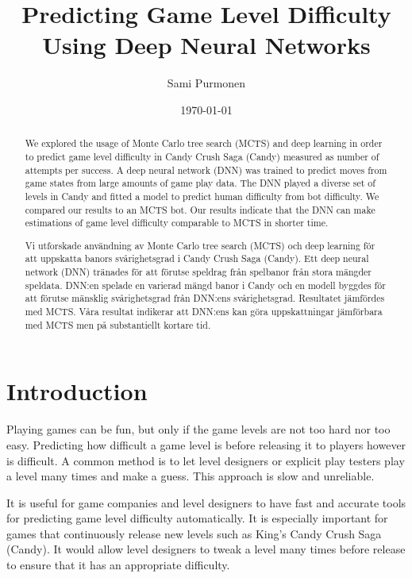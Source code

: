 \documentclass{kththesis}
\title{Predicting Game Level Difficulty Using Deep Neural Networks}
\author{Sami Purmonen}
\date{\today}
\begin{document}
\flyleaf

\begin{abstract}
We explored the usage of Monte Carlo tree search (MCTS) and deep learning in order to predict game level difficulty in Candy Crush Saga (Candy) measured as number of attempts per success. A deep neural network (DNN) was trained to predict moves from game states from large amounts of game play data. The DNN played a diverse set of levels in Candy and fitted a model to predict human difficulty from bot difficulty. We compared our results to an MCTS bot. Our results indicate that the DNN can make estimations of game level difficulty comparable to MCTS in shorter time.
\end{abstract}

\clearpage

\begin{otherlanguage}{swedish}
  \begin{abstract}
  Vi utforskade användning av Monte Carlo tree search (MCTS) och deep learning för att uppskatta banors svårighetsgrad i Candy Crush Saga (Candy). Ett deep neural network (DNN) tränades för att förutse speldrag från spelbanor från stora mängder speldata. DNN:en spelade en varierad mängd banor i Candy och en modell byggdes för att förutse mänsklig svårighetsgrad från DNN:ens svårighetsgrad. Resultatet jämfördes med MCTS. Våra resultat indikerar att DNN:ens kan göra uppskattningar jämförbara med MCTS men på substantiellt kortare tid.
  \end{abstract}
\end{otherlanguage}

\cleardoublepage

\tableofcontents


\mainmatter

\chapter{Introduction}
Playing games can be fun, but only if the game levels are not too hard nor too easy. Predicting how difficult a game level is before releasing it to players however is difficult. A common method is to let level designers or explicit play testers play a level many times and make a guess. This approach is slow and unreliable.

It is useful for game companies and level designers to have fast and accurate tools for predicting game level difficulty automatically. It is especially important for games that continuously release new levels such as King's Candy Crush Saga (Candy). It would allow level designers to tweak a level many times before release to ensure that it has an appropriate difficulty. 
\end{document}
